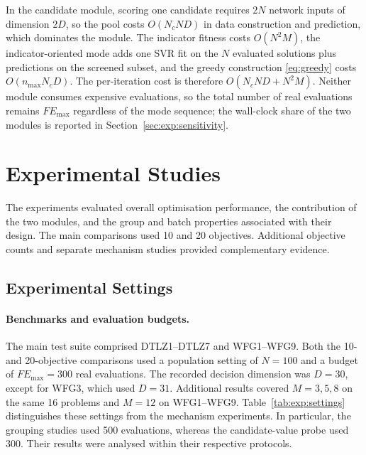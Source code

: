 \documentclass[final,5p,times,twocolumn]{elsarticle}
\begin{document}
In the candidate module, scoring one candidate requires $2N$ network inputs of
dimension $2D$, so the pool costs $O(N_cND)$ in data construction and
prediction, which dominates the module. The indicator fitness costs $O(N^2M)$,
the indicator-oriented mode adds one SVR fit on the $N$ evaluated solutions plus
predictions on the screened subset, and the greedy construction \eqref{eq:greedy}
costs $O(n_{\max}N_cD)$. The per-iteration cost is therefore $O(N_cND+N^2M)$.
Neither module consumes expensive evaluations, so the total number of real
evaluations remains $FE_{\max}$ regardless of the mode sequence; the wall-clock
share of the two modules is reported in Section~\ref{sec:exp:sensitivity}.


\section{Experimental Studies}
\label{sec:exp}

The experiments evaluated overall optimisation performance, the contribution
of the two modules, and the group and batch properties associated with their
design. The main comparisons used 10 and 20 objectives. Additional objective
counts and separate mechanism studies provided complementary evidence.

\subsection{Experimental Settings}
\label{sec:exp:settings}

\paragraph{Benchmarks and evaluation budgets.}
The main test suite comprised DTLZ1--DTLZ7 and WFG1--WFG9. Both the 10- and
20-objective comparisons used a population setting of $N=100$ and a budget of
$FE_{\max}=300$ real evaluations. The recorded decision dimension was $D=30$,
except for WFG3, which used $D=31$. Additional results covered $M=3,5,8$ on the
same 16 problems and $M=12$ on WFG1--WFG9. Table~\ref{tab:exp:settings}
distinguishes these settings from the mechanism experiments. In particular,
the grouping studies used 500 evaluations, whereas the candidate-value probe
used 300. Their results were analysed within their respective protocols.
\end{document}
